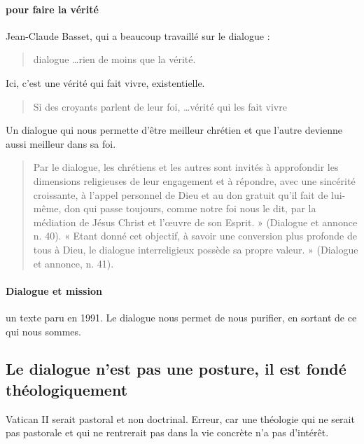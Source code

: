    \paragraph{pour faire la vérité} Jean-Claude Basset, qui a beaucoup travaillé sur le dialogue : 
   \begin{quote}
     dialogue \ldots  rien de moins que la vérité.  
   \end{quote}
   Ici, c'est une vérité qui fait vivre, existentielle. 
   \begin{quote}
          Si des croyants parlent de leur foi, \ldots vérité qui les fait vivre
   \end{quote}
    Un dialogue qui nous permette d'être meilleur chrétien et que l'autre devienne aussi meilleur dans sa foi.     
   \begin{quote}
       Par le dialogue, les chrétiens et les autres sont invités à approfondir les dimensions religieuses de leur engagement et à répondre, avec une sincérité croissante, à l’appel personnel de Dieu et au don gratuit qu’il fait de lui-même, don qui passe toujours, comme notre foi nous le dit, par la médiation de Jésus Christ et l’œuvre de son Esprit. » (Dialogue et annonce n. 40). « Etant donné cet objectif, à savoir une conversion plus profonde de tous à Dieu, le dialogue interreligieux possède sa propre valeur. » (Dialogue et annonce, n. 41). 
   \end{quote}
   
   
 \paragraph{Dialogue et mission} un texte paru en 1991. Le dialogue nous permet de nous purifier, en sortant de ce qui nous sommes. 
   
   \subsection{Le dialogue n'est pas une posture, il est fondé théologiquement}
   
   \begin{Ex}
   Vatican II serait pastoral et non doctrinal. Erreur, car une théologie qui ne serait pas pastorale et qui ne rentrerait pas dans la vie concrète n'a pas d'intérêt.
   \end{Ex}
   
